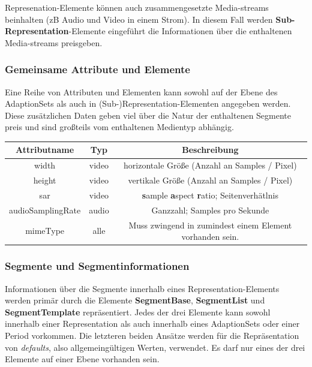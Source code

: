 \documentclass[paper = a4, fontsize = 12pt, parskip = half]{scrartcl} %
\begin{document}
Represenation-Elemente können auch zusammengesetzte Media-streams beinhalten (zB Audio und Video in einem Strom). In diesem Fall werden \textbf{Sub-Representation}-Elemente eingeführt die Informationen über die enthaltenen Media-streams preisgeben.

\subsubsection{Gemeinsame Attribute und Elemente}
Eine Reihe von Attributen und Elementen kann sowohl auf der Ebene des AdaptionSets als auch in (Sub-)Representation-Elementen angegeben werden. Diese zusätzlichen Daten geben viel über die Natur der enthaltenen Segmente preis und sind großteils vom enthaltenen Medientyp abhängig.

\begin{center}
	\begin{tabular}{| c | c | c |}
		\hline
		\textbf{Attributname} & \textbf{Typ} & \textbf{Beschreibung}                                            \\
		\hline
		\hline
		width                 & video        & horizontale Größe (Anzahl an Samples / Pixel)                    \\
		\hline
		height                & video        & vertikale Größe (Anzahl an Samples / Pixel)                      \\
		\hline
		sar                   & video        & \textbf{s}ample \textbf{a}spect \textbf{r}atio; Seitenverhätlnis \\
		\hline
		audioSamplingRate     & audio        & Ganzzahl; Samples pro Sekunde                                    \\
		\hline
		mimeType              & alle         & Muss zwingend in zumindest einem Element vorhanden sein.         \\
		\hline
	\end{tabular}
\end{center}

\subsubsection{Segmente und Segmentinformationen}
Informationen über die Segmente innerhalb eines Representation-Elements werden primär durch die Elemente \textbf{SegmentBase}, \textbf{SegmentList} und \textbf{SegmentTemplate} repräsentiert. Jedes der drei Elemente kann sowohl innerhalb einer Representation als auch innerhalb eines AdaptionSets oder einer Period vorkommen. Die letzteren beiden Ansätze werden für die Repräsentation von \textit{defaults}, also allgemeingültigen Werten, verwendet. Es darf nur eines der drei Elemente auf einer Ebene vorhanden sein.
\end{document}
